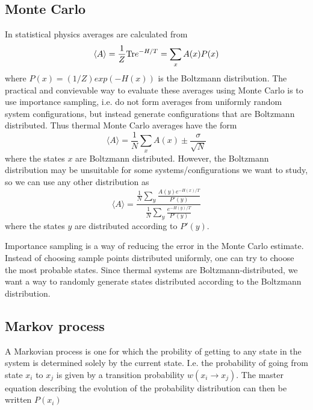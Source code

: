 \subsection{Monte Carlo}
In statistical physics averages are calculated from 
\begin{equation}
  \langle A\rangle = \frac{1}{Z}\textrm{Tr} e^{-H/T} = \sum_x A(x) P(x)
\end{equation}
where  $P(x) = (1/Z)exp(-H(x))$ is the Boltzmann distribution.
The practical and convievable way to evaluate these averages using Monte Carlo is to use importance sampling, i.e. do not form averages from uniformly random system configurations, but instead generate configurations that are Boltzmann distributed.   
Thus thermal Monte Carlo averages have the form 
\begin{equation}
  \langle A \rangle = \frac{1}{N} \sum_x A(x) \pm \frac{\sigma	}{\sqrt N}
\end{equation}
where the states $x$ are Boltzmann distributed.
However, the Boltzmann distribution may be unsuitable for some systems/configurations we want to study, so we can use any other distribution as 
\begin{equation}
  \langle A \rangle = \frac{\frac{1}{N}\sum_y \frac{A(y) e^{-H(x)/T}}{P'(y)}}{\frac{1}{N}\sum_y \frac{e^{-H(y)/T}}{P'(y)}}  
\end{equation}
 where the states $y$ are distributed according to $P'(y)$.

 Importance sampling is a way of reducing the error in the Monte Carlo estimate. Instead of choosing sample points distributed uniformly, one can try to choose the most probable states. Since thermal systems are Boltzmann-distributed, we want a way to randomly generate states distributed according to the Boltzmann distribution.
\subsection{Markov process}
A Markovian process is one for which the probility of getting to any state in the system is determined solely by the current state. I.e. the probability of going from state $x_i$ to $x_{j}$ is given by a transition probability $w(x_i \rightarrow x_j)$. The master equation describing the evolution of the probability distribution can then be written $P(x_i )$
 


